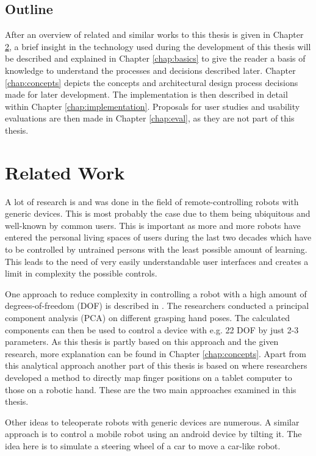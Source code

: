 \section{Outline}
After an overview of related and similar works to this thesis is given in Chapter \ref{chap:related}, a brief insight in the technology used during the development of this thesis will be described and explained in Chapter \ref{chap:basics} to give the reader a basis of knowledge to understand the processes and decisions described later. Chapter \ref{chap:concepts} depicts the concepts and architectural design process decisions made for later development. The implementation is then described in detail within Chapter \ref{chap:implementation}. Proposals for user studies and usability evaluations are then made in Chapter \ref{chap:eval}, as they are not part of this thesis.

\chapter{Related Work}
\label{chap:related}
A lot of research is and was done in the field of remote-controlling robots with generic devices. This is most probably the case due to them being ubiquitous and well-known by common users. This is important as more and more robots have entered the personal living spaces of users during the last two decades\cite{Forlizzi2006} which have to be controlled by untrained persons with the least possible amount of learning. This leads to the need of very easily understandable user interfaces and creates a limit in complexity the possible controls. 

One approach to reduce complexity in controlling a robot with a high amount of degrees-of-freedom (DOF) is described in \cite{Bernardino2013}. The researchers conducted a principal component analysis (PCA) on different grasping hand poses. The calculated components can then be used to control a device with e.g. 22 DOF by just 2-3 parameters. As this thesis is partly based on this approach and the given research, more explanation can be found in Chapter \ref{chap:concepts}. Apart from this analytical approach another part of this thesis is based on \cite{conf:humanoids:TohHLBZP12} where researchers developed a method to directly map finger positions on a tablet computer to those on a robotic hand. These are the two main approaches examined in this thesis.

Other ideas to teleoperate robots with generic devices are numerous. A similar approach is to control a mobile robot using an android device by tilting it\cite{Akupati2017}. The idea here is to simulate a steering wheel of a car to move a car-like robot. 

